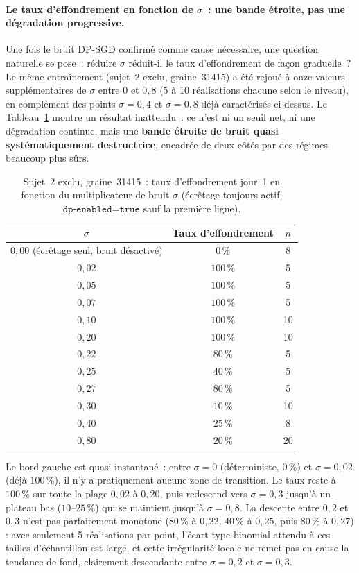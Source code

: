 \documentclass{acmart}
\begin{document}
\paragraph{Le taux d'effondrement en fonction de $\sigma$~: une bande étroite,
pas une dégradation progressive.} Une fois le bruit DP-SGD confirmé comme
cause nécessaire, une question naturelle se pose~: réduire $\sigma$
réduit-il le taux d'effondrement de façon graduelle~? Le même entraînement
(sujet~2 exclu, graine~31415) a été rejoué à onze valeurs supplémentaires
de $\sigma$ entre $0$ et $0{,}8$ (5 à 10 réalisations chacune selon le
niveau), en complément des points $\sigma=0{,}4$ et $\sigma=0{,}8$ déjà
caractérisés ci-dessus. Le Tableau~\ref{tab:sigma_dose_response} montre un
résultat inattendu~: ce n'est ni un seuil net, ni une dégradation continue,
mais une \textbf{bande étroite de bruit quasi systématiquement destructrice},
encadrée de deux côtés par des régimes beaucoup plus sûrs.

\begin{table}[h!]
  \centering
  \small
  \caption{Sujet~2 exclu, graine~31415~: taux d'effondrement jour~1 en
  fonction du multiplicateur de bruit $\sigma$ (écrêtage toujours actif,
  $\texttt{dp-enabled=true}$ sauf la première ligne).}
  \label{tab:sigma_dose_response}
  \begin{tabular}{ccc}
    \toprule
    $\sigma$ & Taux d'effondrement & $n$ \\
    \midrule
    $0{,}00$ (écrêtage seul, bruit désactivé) & $0\,\%$ & 8 \\
    $0{,}02$ & $100\,\%$ & 5 \\
    $0{,}05$ & $100\,\%$ & 5 \\
    $0{,}07$ & $100\,\%$ & 5 \\
    $0{,}10$ & $100\,\%$ & 10 \\
    $0{,}20$ & $100\,\%$ & 10 \\
    $0{,}22$ & $80\,\%$ & 5 \\
    $0{,}25$ & $40\,\%$ & 5 \\
    $0{,}27$ & $80\,\%$ & 5 \\
    $0{,}30$ & $10\,\%$ & 10 \\
    $0{,}40$ & $25\,\%$ & 8 \\
    $0{,}80$ & $20\,\%$ & 20 \\
    \bottomrule
  \end{tabular}
\end{table}

Le bord gauche est quasi instantané~: entre $\sigma=0$ (déterministe, $0\,\%$)
et $\sigma=0{,}02$ (déjà $100\,\%$), il n'y a pratiquement aucune zone de
transition. Le taux reste à $100\,\%$ sur toute la plage $0{,}02$ à
$0{,}20$, puis redescend vers $\sigma=0{,}3$ jusqu'à un plateau bas
($10$--$25\,\%$) qui se maintient jusqu'à $\sigma=0{,}8$. La descente entre
$0{,}2$ et $0{,}3$ n'est pas parfaitement monotone ($80\,\%$ à $0{,}22$,
$40\,\%$ à $0{,}25$, puis $80\,\%$ à $0{,}27$) : avec seulement 5
réalisations par point, l'écart-type binomial attendu à ces tailles
d'échantillon est large, et cette irrégularité locale ne remet pas en cause
la tendance de fond, clairement descendante entre $\sigma=0{,}2$ et
$\sigma=0{,}3$.
\end{document}
